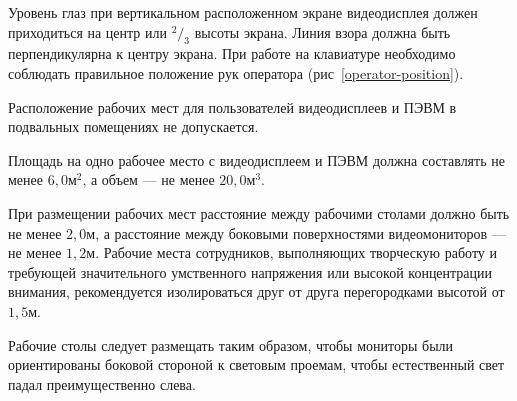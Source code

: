 Уровень глаз при вертикальном расположенном экране видеодисплея должен приходиться на центр или \(^2/_3\) высоты экрана. Линия взора должна быть перпендикулярна к центру экрана. При работе на клавиатуре необходимо соблюдать правильное положение рук оператора (рис~\ref{operator-position}).

Расположение рабочих мест для пользователей видеодисплеев и ПЭВМ в подвальных помещениях не допускается.

Площадь на одно рабочее место с видеодисплеем и ПЭВМ должна составлять не менее \(6,0 \text{м}^2\), а объем --- не менее \(20,0 \text{м}^3\).

При размещении рабочих мест расстояние между рабочими столами должно быть не менее \(2,0 \text{м}\), а расстояние между боковыми поверхностями видеомониторов --- не менее \(1,2 \text{м}\). Рабочие места сотрудников, выполняющих творческую работу и требующей значительного умственного напряжения или высокой концентрации внимания, рекомендуется изолироваться друг от друга перегородками высотой от \(1,5 \text{м}\).

Рабочие столы следует размещать таким образом, чтобы мониторы были ориентированы боковой стороной к световым проемам, чтобы естественный свет падал преимущественно слева.
\newpage
